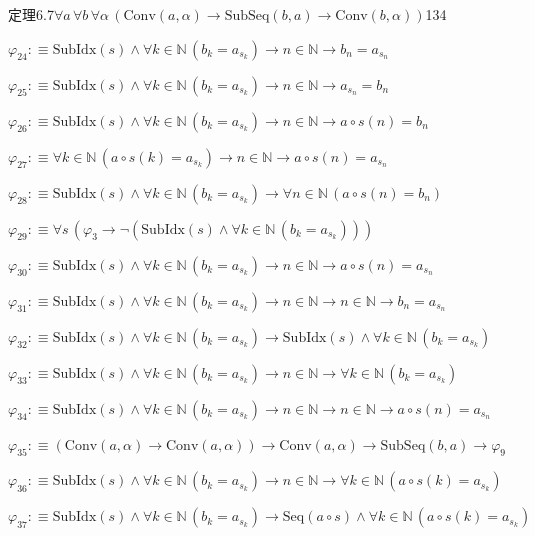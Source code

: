\begin{fullproof}{定理6.7}{$\forall a\,\forall b\,\forall \alpha\,(\mathrm{Conv}(a,\alpha) \to \mathrm{SubSeq}(b,a) \to \mathrm{Conv}(b,\alpha))$}{134}
\begin{abbrevlist}
\item $\varphi_{24} :\equiv \mathrm{SubIdx}(s) \land \forall k \in \mathbb{N}\,(b_{k} = a_{s_{k}}) \to n \in \mathbb{N} \to b_{n} = a_{s_{n}}$
\item $\varphi_{25} :\equiv \mathrm{SubIdx}(s) \land \forall k \in \mathbb{N}\,(b_{k} = a_{s_{k}}) \to n \in \mathbb{N} \to a_{s_{n}} = b_{n}$
\item $\varphi_{26} :\equiv \mathrm{SubIdx}(s) \land \forall k \in \mathbb{N}\,(b_{k} = a_{s_{k}}) \to n \in \mathbb{N} \to a \circ s(n) = b_{n}$
\item $\varphi_{27} :\equiv \forall k \in \mathbb{N}\,(a \circ s(k) = a_{s_{k}}) \to n \in \mathbb{N} \to a \circ s(n) = a_{s_{n}}$
\item $\varphi_{28} :\equiv \mathrm{SubIdx}(s) \land \forall k \in \mathbb{N}\,(b_{k} = a_{s_{k}}) \to \forall n \in \mathbb{N}\,(a \circ s(n) = b_{n})$
\item $\varphi_{29} :\equiv \forall s\,(\varphi_{3} \to \neg (\mathrm{SubIdx}(s) \land \forall k \in \mathbb{N}\,(b_{k} = a_{s_{k}})))$
\item $\varphi_{30} :\equiv \mathrm{SubIdx}(s) \land \forall k \in \mathbb{N}\,(b_{k} = a_{s_{k}}) \to n \in \mathbb{N} \to a \circ s(n) = a_{s_{n}}$
\item $\varphi_{31} :\equiv \mathrm{SubIdx}(s) \land \forall k \in \mathbb{N}\,(b_{k} = a_{s_{k}}) \to n \in \mathbb{N} \to n \in \mathbb{N} \to b_{n} = a_{s_{n}}$
\item $\varphi_{32} :\equiv \mathrm{SubIdx}(s) \land \forall k \in \mathbb{N}\,(b_{k} = a_{s_{k}}) \to \mathrm{SubIdx}(s) \land \forall k \in \mathbb{N}\,(b_{k} = a_{s_{k}})$
\item $\varphi_{33} :\equiv \mathrm{SubIdx}(s) \land \forall k \in \mathbb{N}\,(b_{k} = a_{s_{k}}) \to n \in \mathbb{N} \to \forall k \in \mathbb{N}\,(b_{k} = a_{s_{k}})$
\item $\varphi_{34} :\equiv \mathrm{SubIdx}(s) \land \forall k \in \mathbb{N}\,(b_{k} = a_{s_{k}}) \to n \in \mathbb{N} \to n \in \mathbb{N} \to a \circ s(n) = a_{s_{n}}$
\item $\varphi_{35} :\equiv (\mathrm{Conv}(a,\alpha) \to \mathrm{Conv}(a,\alpha)) \to \mathrm{Conv}(a,\alpha) \to \mathrm{SubSeq}(b,a) \to \varphi_{9}$
\item $\varphi_{36} :\equiv \mathrm{SubIdx}(s) \land \forall k \in \mathbb{N}\,(b_{k} = a_{s_{k}}) \to n \in \mathbb{N} \to \forall k \in \mathbb{N}\,(a \circ s(k) = a_{s_{k}})$
\item $\varphi_{37} :\equiv \mathrm{SubIdx}(s) \land \forall k \in \mathbb{N}\,(b_{k} = a_{s_{k}}) \to \mathrm{Seq}(a \circ s) \land \forall k \in \mathbb{N}\,(a \circ s(k) = a_{s_{k}})$

\end{abbrevlist}
\end{fullproof}
